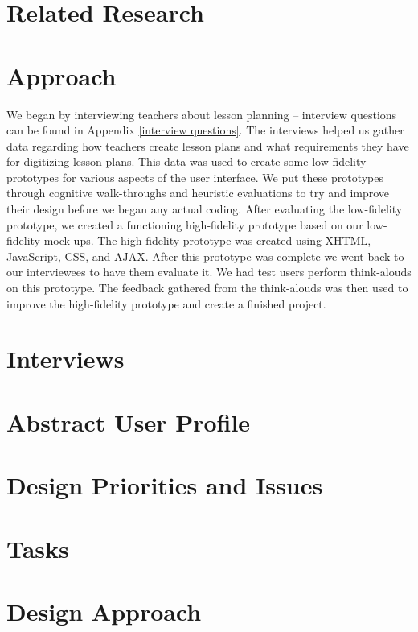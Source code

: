 \documentclass[10pt,letter]{article}
\begin{document}
\section{Related Research}

\section{Approach}
We began by interviewing teachers about lesson planning -- interview questions
can be found in Appendix \ref{interview questions}. The interviews helped us
gather data regarding how teachers create lesson plans and what requirements
they have for digitizing lesson plans. This data was used to create some
low-fidelity prototypes for various aspects of the user interface. We put these
prototypes through cognitive walk-throughs and heuristic evaluations to try and
improve their design before we began any actual coding. After evaluating the
low-fidelity prototype, we created a functioning high-fidelity prototype based
on our low-fidelity mock-ups. The high-fidelity prototype was created using
XHTML, JavaScript, CSS, and AJAX. After this prototype was complete we went back
to our interviewees to have them evaluate it. We had test users perform
think-alouds on this prototype. The feedback gathered from the think-alouds was
then used to improve the high-fidelity prototype and create a finished project.

\section{Interviews}

\section{Abstract User Profile}

\section{Design Priorities and Issues}

\section{Tasks}

\section{Design Approach}
\end{document}
